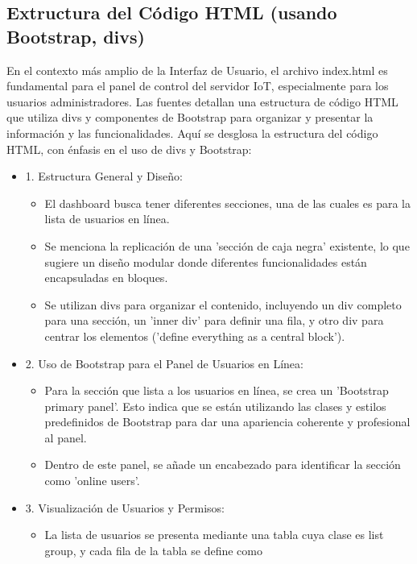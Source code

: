 \documentclass{report}
\begin{document}
\subsection{Extructura del Código HTML (usando Bootstrap, divs)}
En el contexto más amplio de la Interfaz de Usuario, el archivo index.html es fundamental para el panel de control del servidor IoT, 
especialmente para los usuarios administradores. Las fuentes detallan una estructura de código HTML que utiliza divs y componentes de 
Bootstrap para organizar y presentar la información y las funcionalidades.
Aquí se desglosa la estructura del código HTML, con énfasis en el uso de divs y Bootstrap:
\begin{itemize}
    \item 1. Estructura General y Diseño:
        \begin{itemize}
            \item El dashboard busca tener diferentes secciones, una de las cuales es para la lista de usuarios en línea.
            \item Se menciona la replicación de una 'sección de caja negra' existente, lo que sugiere un diseño modular donde diferentes 
            funcionalidades están encapsuladas en bloques.
            \item Se utilizan divs para organizar el contenido, incluyendo un div completo para una sección, un 'inner div' para definir 
            una fila, y otro div para centrar los elementos ('define everything as a central block').
        \end{itemize}
    \item 2. Uso de Bootstrap para el Panel de Usuarios en Línea:
        \begin{itemize}
            \item Para la sección que lista a los usuarios en línea, se crea un 'Bootstrap primary panel'. Esto indica que se están 
            utilizando las clases y estilos predefinidos de Bootstrap para dar una apariencia coherente y profesional al panel.
            \item Dentro de este panel, se añade un encabezado para identificar la sección como 'online users'.
        \end{itemize}
    \item 3. Visualización de Usuarios y Permisos:
        \begin{itemize}
            \item La lista de usuarios se presenta mediante una tabla cuya clase es list group, y cada fila de la tabla se define como 

\end{itemize}
\end{itemize}
\end{document}
